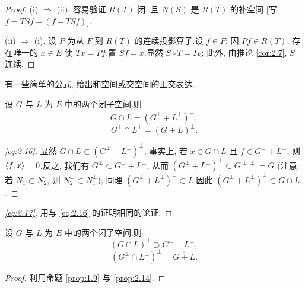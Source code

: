\begin{proof}
(i) $\Rightarrow$ (ii). 容易验证 $R(T)$ 闭, 且 $N(S)$ 是 $R(T)$ 的补空间
[写 $f=TSf+(f-TSf)$].

(ii) $\Rightarrow$ (i). 设 $P$ 为从 $F$ 到 $R(T)$ 的连续投影算子.设 $f\in F$;
因 $Pf\in R(T)$, 存在唯一的 $x\in E$ 使 $Tx=Pf$.置 $Sf=x$.显然
$S\circ T=I_E$; 此外, 由推论  \ref{cor:2.7}, $S$ 连续.
\end{proof}

\label{sec:2.5}

有一些简单的公式, 给出和空间或交空间的正交表达.

\begin{proposition}
\label{prop:2.14}
设 $G$ 与 $L$ 为 $E$ 中的两个闭子空间.则
\begin{equation}
G\cap L=(G^\perp+L^\perp)^\perp,
\label{eq:2.16}
\end{equation}
\begin{equation}
G^\perp\cap L^\perp=(G+L)^\perp.
\label{eq:2.17}
\end{equation}
\end{proposition}

\begin{proof}[\eqref{eq:2.16}]
显然 $G\cap L\subset(G^\perp+L^\perp)^\perp$; 事实上, 若 $x\in G\cap L$ 且
$f\in G^\perp+L^\perp$, 则 $\left\langle f,x\right\rangle=0$.反之, 我们有
$G^\perp\subset G^\perp+L^\perp$, 从而 $(G^\perp+L^\perp)^\perp\subset
G^{\perp\perp}=G$ (注意: 若 $N_1\subset N_2$, 则 $N_2^\perp\subset N_1^\perp$);
同理 $(G^\perp+L^\perp)^\perp\subset L$.因此 $(G^\perp+L^\perp)^\perp\subset
G\cap L$.
\end{proof}

\begin{proof}[\eqref{eq:2.17}]
用与 \eqref{eq:2.16} 的证明相同的论证.
\end{proof}

\begin{corollary}
\label{cor:2.15}
设 $G$ 与 $L$ 为 $E$ 中的两个闭子空间.则
\begin{equation}
(G\cap L)^\perp\supset G^\perp+L^\perp,
\label{eq:2.18}
\end{equation}
\begin{equation}
(G^\perp\cap L^\perp)^\perp=\overline{G+L}.
\label{eq:2.19}
\end{equation}
\end{corollary}

\begin{proof}
利用命题  \ref{prop:1.9} 与  \ref{prop:2.14}.
\end{proof}

